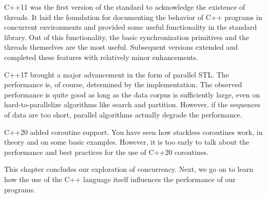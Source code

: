 C++11 was the first version of the standard to acknowledge the existence of threads. It laid the foundation for documenting the behavior of C++ programs in concurrent environments and provided some useful functionality in the standard library. Out of this functionality, the basic synchronization primitives and the threads themselves are the most useful. Subsequent versions extended and completed these features with relatively minor enhancements.

C++17 brought a major advancement in the form of parallel STL. The performance is, of course, determined by the implementation. The observed performance is quite good as long as the data corpus is sufficiently large, even on hard-to-parallelize algorithms like search and partition. However, if the sequences of data are too short, parallel algorithms actually degrade the performance.

C++20 added coroutine support. You have seen how stackless coroutines work, in theory and on some basic examples. However, it is too early to talk about the performance and best practices for the use of C++20 coroutines.

This chapter concludes our exploration of concurrency. Next, we go on to learn how the use of the C++ language itself influences the performance of our programs.